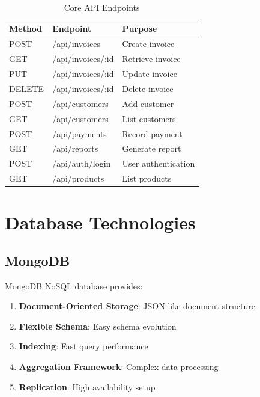 \documentclass[12pt,a4paper]{report}
\begin{document}
\begin{table}[H]
    \centering
    \small
    \begin{tabular}{|l|l|l|}
        \hline
        \textbf{Method} & \textbf{Endpoint} & \textbf{Purpose} \\
        \hline
        POST & /api/invoices & Create invoice \\
        \hline
        GET & /api/invoices/:id & Retrieve invoice \\
        \hline
        PUT & /api/invoices/:id & Update invoice \\
        \hline
        DELETE & /api/invoices/:id & Delete invoice \\
        \hline
        POST & /api/customers & Add customer \\
        \hline
        GET & /api/customers & List customers \\
        \hline
        POST & /api/payments & Record payment \\
        \hline
        GET & /api/reports & Generate report \\
        \hline
        POST & /api/auth/login & User authentication \\
        \hline
        GET & /api/products & List products \\
        \hline
    \end{tabular}
    \caption{Core API Endpoints}
\end{table}

\section{Database Technologies}

\subsection{MongoDB}

MongoDB NoSQL database provides:

\begin{enumerate}[label=\roman*)]
    \item \textbf{Document-Oriented Storage}: JSON-like document structure
    \item \textbf{Flexible Schema}: Easy schema evolution
    \item \textbf{Indexing}: Fast query performance
    \item \textbf{Aggregation Framework}: Complex data processing
    \item \textbf{Replication}: High availability setup
\end{enumerate}
\end{document}
